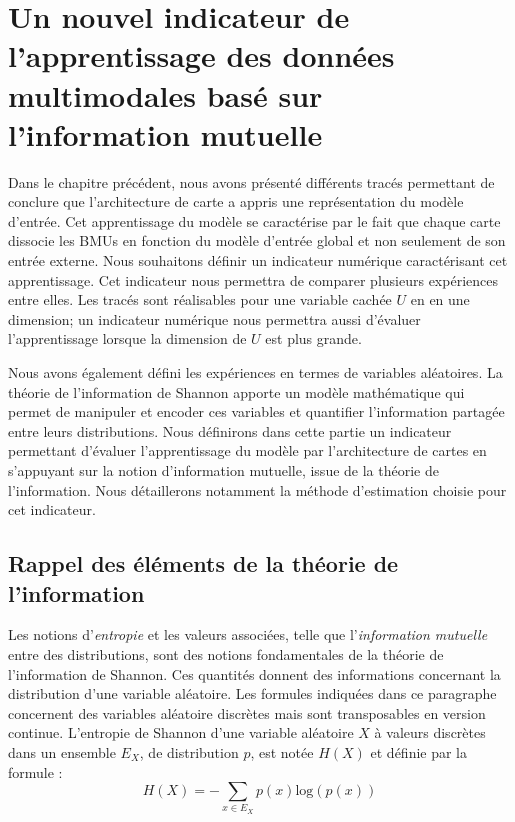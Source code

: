 \chapter{Un nouvel indicateur de l'apprentissage des données multimodales basé sur l'information mutuelle}
\graphicspath{{03-Representation/}}
\minitoc

Dans le chapitre précédent, nous avons présenté différents tracés permettant de conclure que l'architecture de carte a appris une représentation du modèle d'entrée. Cet apprentissage du modèle se caractérise par le fait que chaque carte dissocie les BMUs en fonction du modèle d'entrée global et non seulement de son entrée externe. 
Nous souhaitons définir un indicateur numérique caractérisant cet apprentissage. Cet indicateur nous permettra de comparer plusieurs expériences entre elles. Les tracés sont réalisables pour une variable cachée $U$ en en une dimension; un indicateur numérique nous permettra aussi d'évaluer l'apprentissage lorsque la dimension de $U$ est plus grande.

Nous avons également défini les expériences en termes de variables aléatoires. La théorie de l'information de Shannon \cite{Shannon1948AMT} apporte un modèle mathématique qui permet de manipuler et encoder ces variables et quantifier l'information partagée entre leurs distributions.
Nous définirons dans cette partie un indicateur permettant d'évaluer l'apprentissage du modèle par l'architecture de cartes en s'appuyant sur la notion d'information mutuelle, issue de la théorie de l'information. Nous détaillerons notamment la méthode d'estimation choisie pour cet indicateur.

\section{Rappel des éléments de la théorie de l'information}

Les notions d'\emph{entropie} et les valeurs associées, telle que l'\emph{information mutuelle} entre des distributions, sont des notions fondamentales de la théorie de l'information de Shannon. Ces quantités donnent des informations concernant la distribution d'une variable aléatoire.
Les formules indiquées dans ce paragraphe concernent des variables aléatoire discrètes mais sont transposables en version continue.
L'entropie de Shannon d'une variable aléatoire $X$ à valeurs discrètes dans un ensemble $E_X$, de distribution $p$, est notée $H(X)$ et définie par la formule : 
\begin{equation}
H(X) = - \sum_{x \in E_X}{p(x)\textrm{log}(p(x))}
\end{equation}

